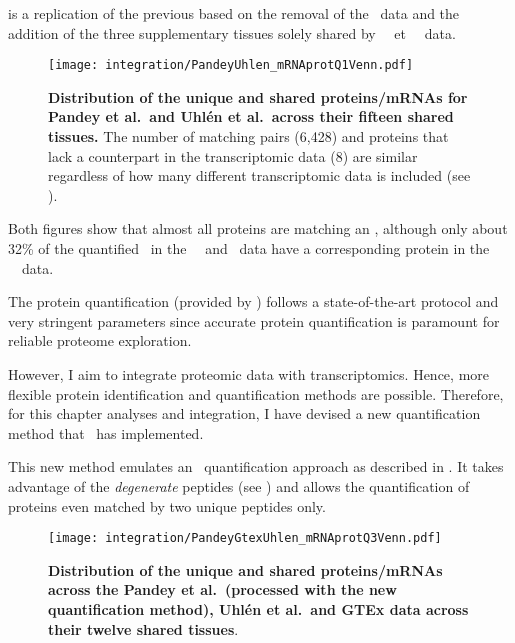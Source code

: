  is a replication of the previous 
based on the removal of the \gtex\ data
and the addition of the three supplementary tissues solely shared
by \pandey\ \etal\ et \uhlen\ \etal\ data.%

\begin{figure}[!htb]
    \texttt{[image: integration/PandeyUhlen\_mRNAprotQ1Venn.pdf]}\centering
    \vspace{-3.5mm}
    \caption[Distribution of the unique and shared proteins/mRNAs for Pandey et al.\
    and Uhlén et al.\ across fifteen tissues.]{%
    \label{fig:PU_vennQ1}\textbf{Distribution of the unique and shared proteins/mRNAs
    for Pandey et al.\ and Uhlén et al.\ across their fifteen shared tissues.}
    The number of matching pairs (6,428) and proteins that lack a counterpart in
    the transcriptomic data (8) are similar regardless of how many different
    transcriptomic data is included (see \Cref{fig:PGU_vennQ1}).}
\end{figure}

Both figures show that almost all proteins are matching an \mRNA{},
although only about 32\% of the quantified \mRNAs\
in the \uhlen\ \etal\ and \gtex\ data
have a corresponding protein in the \pandey\ \etal\ data.

The protein quantification (provided by \james) follows
a state-of-the-art protocol and very stringent parameters
since accurate protein quantification is paramount for reliable proteome exploration.

However, I aim to integrate proteomic data with transcriptomics.
Hence, more flexible protein identification and quantification methods are possible.
Therefore, for this chapter analyses and integration,
I have devised a new quantification method that \james\ has implemented.%

This new method emulates an \Rnaseq\ quantification approach
as described in .
It takes advantage of the \emph{degenerate} peptides (see )
and allows the quantification of proteins even matched by two unique peptides only.%

\begin{figure}[!ht]
    \texttt{[image: integration/PandeyGtexUhlen\_mRNAprotQ3Venn.pdf]}\centering
    \vspace{-4mm}
    \caption[Distribution of the unique and shared proteins/mRNAs
    across the three datasets and twelve tissues
    (with the new protein quantification method)]{\label{fig:PGU_venQ3}%
    \textbf{Distribution of the unique and shared proteins/mRNAs
    across the Pandey et al.\ (processed with the new quantification method),
    Uhlén et al.\ and GTEx data across their twelve shared tissues}.
    }
\end{figure}

